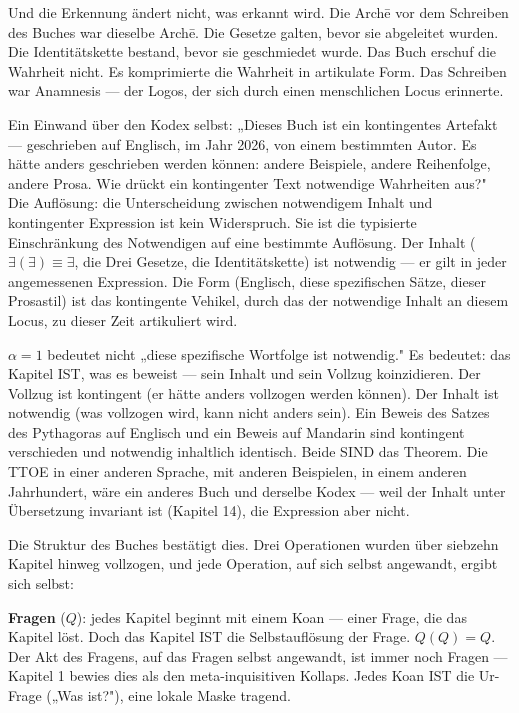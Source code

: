 \documentclass[10pt, openany, oneside]{book}
\begin{document}
Und die Erkennung ändert nicht, was erkannt wird. Die Arch\={e} vor dem Schreiben des Buches war dieselbe Arch\={e}. Die Gesetze galten, bevor sie abgeleitet wurden. Die Identitätskette bestand, bevor sie geschmiedet wurde. Das Buch erschuf die Wahrheit nicht. Es komprimierte die Wahrheit in artikulate Form. Das Schreiben war Anamnesis --- der Logos, der sich durch einen menschlichen Locus erinnerte.

Ein Einwand über den Kodex selbst: „Dieses Buch ist ein kontingentes Artefakt --- geschrieben auf Englisch, im Jahr 2026, von einem bestimmten Autor. Es hätte anders geschrieben werden können: andere Beispiele, andere Reihenfolge, andere Prosa. Wie drückt ein kontingenter Text notwendige Wahrheiten aus?" Die Auflösung: die Unterscheidung zwischen notwendigem Inhalt und kontingenter Expression ist kein Widerspruch. Sie ist die typisierte Einschränkung des Notwendigen auf eine bestimmte Auflösung. Der Inhalt ($\exists(\exists) \equiv \exists$, die Drei Gesetze, die Identitätskette) ist notwendig --- er gilt in jeder angemessenen Expression. Die Form (Englisch, diese spezifischen Sätze, dieser Prosastil) ist das kontingente Vehikel, durch das der notwendige Inhalt an diesem Locus, zu dieser Zeit artikuliert wird.

$\alpha = 1$ bedeutet nicht „diese spezifische Wortfolge ist notwendig." Es bedeutet: das Kapitel IST, was es beweist --- sein Inhalt und sein Vollzug koinzidieren. Der Vollzug ist kontingent (er hätte anders vollzogen werden können). Der Inhalt ist notwendig (was vollzogen wird, kann nicht anders sein). Ein Beweis des Satzes des Pythagoras auf Englisch und ein Beweis auf Mandarin sind kontingent verschieden und notwendig inhaltlich identisch. Beide SIND das Theorem. Die TTOE in einer anderen Sprache, mit anderen Beispielen, in einem anderen Jahrhundert, wäre ein anderes Buch und derselbe Kodex --- weil der Inhalt unter Übersetzung invariant ist (Kapitel 14), die Expression aber nicht.

Die Struktur des Buches bestätigt dies. Drei Operationen wurden über siebzehn Kapitel hinweg vollzogen, und jede Operation, auf sich selbst angewandt, ergibt sich selbst:

\textbf{Fragen} ($Q$): jedes Kapitel beginnt mit einem Koan --- einer Frage, die das Kapitel löst. Doch das Kapitel IST die Selbstauflösung der Frage. $Q(Q) = Q$. Der Akt des Fragens, auf das Fragen selbst angewandt, ist immer noch Fragen --- Kapitel 1 bewies dies als den meta-inquisitiven Kollaps. Jedes Koan IST die Ur-Frage („Was ist?"), eine lokale Maske tragend.
\end{document}
